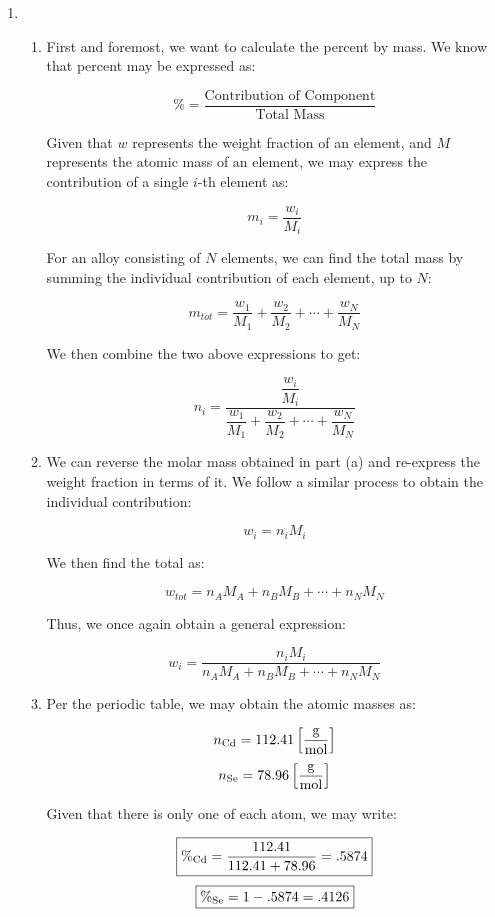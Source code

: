 \begin{enumerate}

  \item 

    \begin{enumerate}

      \item First and foremost, we want to calculate the percent by mass. We know that percent may be expressed as:

        $$\%=\frac{\text{Contribution of Component}}{\text{Total Mass}}$$

        Given that $w$ represents the weight fraction of an element, and $M$ represents the atomic mass of an element, we may express the contribution of a single $i$-th element as:

        $$m_i=\frac{w_i}{M_i}$$

        For an alloy consisting of $N$ elements, we can find the total mass by summing the individual contribution of each element, up to $N$:

        $$m_{tot}=\frac{w_1}{M_1}+\frac{w_2}{M_2}+\cdots+\frac{w_N}{M_N}$$

        We then combine the two above expressions to get:

        $$\boxed{n_i=\frac{\dfrac{w_i}{M_i}}{\dfrac{w_1}{M_1}+\dfrac{w_2}{M_2}+\cdots+\dfrac{w_N}{M_N}}}$$

      \item We can reverse the molar mass obtained in part (a) and re-express the weight fraction in terms of it. We follow a similar process to obtain the individual contribution:

        $$w_i=n_iM_i$$

        We then find the total as:

        $$w_{tot}=n_AM_A+n_BM_B+\cdots+n_NM_N$$

        Thus, we once again obtain a general expression:

        $$\boxed{w_i=\frac{n_iM_i}{n_AM_A+n_BM_B+\cdots+n_NM_N}}$$

      \item Per the periodic table, we may obtain the atomic masses as:

        $$n_{\ce{Cd}}=112.41\left[ \si{\gram\over\mol} \right]$$
        $$n_{\ce{Se}}=78.96\left[ \si{\gram\over\mol} \right]$$

        Given that there is only one of each atom, we may write:

        $$\boxed{\%_{\ce{Cd}}=\frac{112.41}{112.41+78.96}=.5874}$$
        $$\boxed{\%_{\ce{Se}}=1-.5874=.4126}$$


\end{enumerate}
\end{enumerate}
